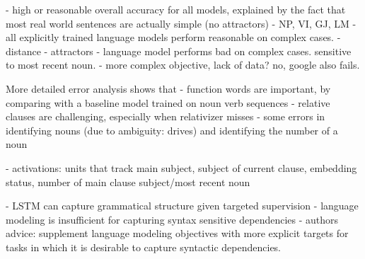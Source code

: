 
- high or reasonable overall accuracy for all models, explained by the fact that most real world sentences are actually simple (no attractors)
   - NP, VI, GJ, LM
- all explicitly trained language models perform reasonable on complex cases.
   - distance
   - attractors
- language model performs bad on complex cases. sensitive to most recent noun.
  - more complex objective, lack of data? no, google also fails.

More detailed error analysis shows that
- function words are important, by comparing with a baseline model trained on noun verb sequences
- relative clauses are challenging, especially when relativizer misses
- some errors in identifying nouns (due to ambiguity: drives) and identifying the number of a noun

- activations: units that track main subject, subject of current clause, embedding status, number of main clause subject/most recent noun

- LSTM can capture grammatical structure given targeted supervision
- language modeling is insufficient for capturing syntax sensitive dependencies
- authors advice: supplement language modeling objectives with more explicit targets
for tasks in which it is desirable to capture syntactic dependencies.